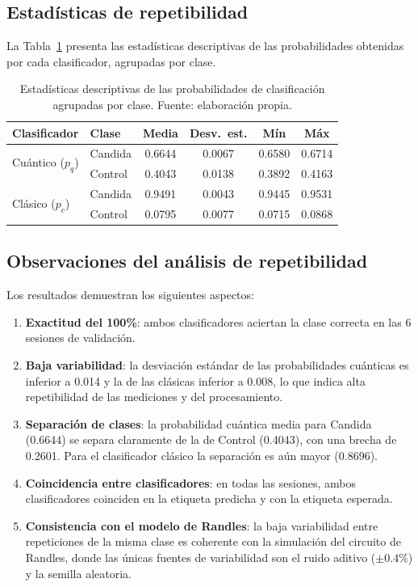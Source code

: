 \documentclass[11pt,a4paper,spanish]{book}
\begin{document}
\subsection{Estad\'{i}sticas de repetibilidad}

La Tabla~\ref{tab:estadisticas-repetibilidad} presenta las estad\'{i}sticas descriptivas de las probabilidades obtenidas por cada clasificador, agrupadas por clase.

\begin{table}[ht]
\centering
\begin{tabular}{l l c c c c}
\hline\hline
Clasificador & Clase & Media & Desv.\ est. & M\'{i}n & M\'{a}x \\ [0.5ex]
\hline
\multirow{2}{*}{Cu\'{a}ntico ($p_q$)} & Candida & 0.6644 & 0.0067 & 0.6580 & 0.6714 \\
 & Control & 0.4043 & 0.0138 & 0.3892 & 0.4163 \\
\hline
\multirow{2}{*}{Cl\'{a}sico ($p_c$)} & Candida & 0.9491 & 0.0043 & 0.9445 & 0.9531 \\
 & Control & 0.0795 & 0.0077 & 0.0715 & 0.0868 \\
\hline
\end{tabular}
\caption[Estad\'{i}sticas de repetibilidad]{Estad\'{i}sticas descriptivas de las probabilidades de clasificaci\'{o}n agrupadas por clase. Fuente: elaboraci\'{o}n propia.}
\label{tab:estadisticas-repetibilidad}
\end{table}

\subsection{Observaciones del an\'{a}lisis de repetibilidad}

Los resultados demuestran los siguientes aspectos:

\begin{enumerate}
	\item \textbf{Exactitud del 100\%}: ambos clasificadores aciertan la clase correcta en las 6 sesiones de validaci\'{o}n.
	\item \textbf{Baja variabilidad}: la desviaci\'{o}n est\'{a}ndar de las probabilidades cu\'{a}nticas es inferior a 0.014 y la de las cl\'{a}sicas inferior a 0.008, lo que indica alta repetibilidad de las mediciones y del procesamiento.
	\item \textbf{Separaci\'{o}n de clases}: la probabilidad cu\'{a}ntica media para Candida (0.6644) se separa claramente de la de Control (0.4043), con una brecha de 0.2601. Para el clasificador cl\'{a}sico la separaci\'{o}n es a\'{u}n mayor (0.8696).
	\item \textbf{Coincidencia entre clasificadores}: en todas las sesiones, ambos clasificadores coinciden en la etiqueta predicha y con la etiqueta esperada.
	\item \textbf{Consistencia con el modelo de Randles}: la baja variabilidad entre repeticiones de la misma clase es coherente con la simulaci\'{o}n del circuito de Randles, donde las \'{u}nicas fuentes de variabilidad son el ruido aditivo ($\pm 0.4\%$) y la semilla aleatoria.
\end{enumerate}
\end{document}
